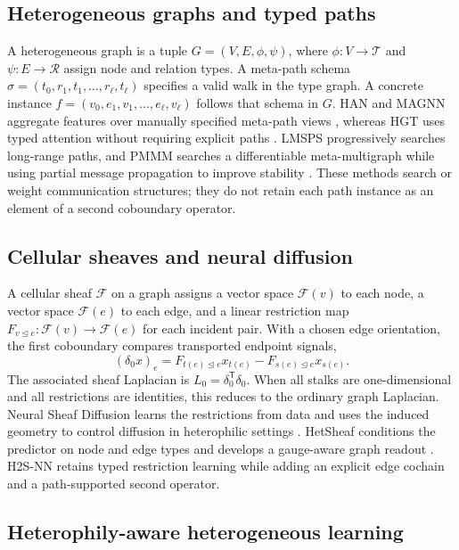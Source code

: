 \documentclass{article}
\newcommand{\method}{\textsc{H2S-NN}}
\newcommand{\cF}{\mathcal{F}}
\newcommand{\transpose}{\mathsf{T}}
\begin{document}
\subsection{Heterogeneous graphs and typed paths}

A heterogeneous graph is a tuple $G=(V,E,\phi,\psi)$, where $\phi:V\rightarrow\mathcal{T}$ and
$\psi:E\rightarrow\mathcal{R}$ assign node and relation types. A meta-path schema
$\sigma=(t_0,r_1,t_1,\ldots,r_\ell,t_\ell)$ specifies a valid walk in the type graph. A concrete
instance $f=(v_0,e_1,v_1,\ldots,e_\ell,v_\ell)$ follows that schema in $G$. HAN and MAGNN aggregate
features over manually specified meta-path views \citep{wang2019han,fu2020magnn}, whereas HGT uses
typed attention without requiring explicit paths \citep{hu2020hgt}. LMSPS progressively searches
long-range paths, and PMMM searches a differentiable meta-multigraph while using partial message
propagation to improve stability \citep{yan2024lmsps,jiang2022pmmm}. These methods search or weight
communication structures; they do not retain each path instance as an element of a second
coboundary operator.

\subsection{Cellular sheaves and neural diffusion}

A cellular sheaf $\cF$ on a graph assigns a vector space $\cF(v)$ to each node, a vector space
$\cF(e)$ to each edge, and a linear restriction map $F_{v\unlhd e}:\cF(v)\rightarrow\cF(e)$ for
each incident pair. With a chosen edge orientation, the first coboundary compares transported
endpoint signals,
\begin{equation}
  (\delta_0 x)_e = F_{t(e)\unlhd e}x_{t(e)}-F_{s(e)\unlhd e}x_{s(e)}.
  \label{eq:background-delta0}
\end{equation}
The associated sheaf Laplacian is $L_0=\delta_0^{\transpose}\delta_0$. When all stalks are
one-dimensional and all restrictions are identities, this reduces to the ordinary graph
Laplacian. Neural Sheaf Diffusion learns the restrictions from data and uses the induced geometry
to control diffusion in heterophilic settings \citep{bodnar2022neural}. HetSheaf conditions the
predictor on node and edge types and develops a gauge-aware graph readout
\citep{braithwaite2024hetsheaf}. \method{} retains typed restriction learning while adding an
explicit edge cochain and a path-supported second operator.

\subsection{Heterophily-aware heterogeneous learning}
\end{document}
